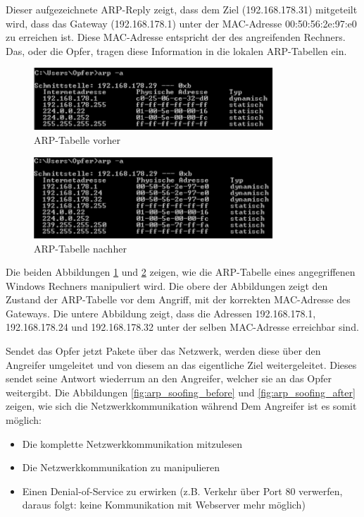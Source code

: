 Dieser aufgezeichnete ARP-Reply zeigt, dass dem Ziel (192.168.178.31) mitgeteilt wird, dass das Gateway (192.168.178.1) unter der MAC-Adresse 00:50:56:2e:97:e0 zu erreichen ist. Diese MAC-Adresse entspricht der des angreifenden Rechners.
Das, oder die Opfer, tragen diese Information in die lokalen ARP-Tabellen ein.
\\
\begin{figure}[h!]
	\centering
		\includegraphics[width=0.80\textwidth]{bilder/arpSpoofing/arp_vorher.pdf}
	\caption{ARP-Tabelle vorher}
	\label{fig:arp_vorher}
\end{figure}

\begin{figure}[h!]
	\centering
		\includegraphics[width=0.80\textwidth]{bilder/arpSpoofing/arp_nachher.pdf}
	\caption{ARP-Tabelle nachher}
	\label{fig:arp_nachher}
\end{figure}

Die beiden Abbildungen \ref{fig:arp_vorher} und \ref{fig:arp_nachher} zeigen, wie die ARP-Tabelle eines angegriffenen Windows Rechners manipuliert wird. Die obere der Abbildungen zeigt den Zustand der ARP-Tabelle vor dem Angriff, mit der korrekten MAC-Adresse des Gateways. Die untere Abbildung zeigt, dass die Adressen 192.168.178.1, 192.168.178.24 und 192.168.178.32 unter der selben MAC-Adresse erreichbar sind.

Sendet das Opfer jetzt Pakete über das Netzwerk, werden diese über den Angreifer umgeleitet und von diesem an das eigentliche Ziel weitergeleitet. Dieses sendet seine Antwort wiederrum an den Angreifer, welcher sie an das Opfer weitergibt. Die Abbildungen \ref{fig:arp_soofing_before} und \ref{fig:arp_soofing_after} zeigen, wie sich die Netzwerkkommunikation während 
Dem Angreifer ist es somit möglich:
\begin{itemize}
	\item Die komplette Netzwerkkommunikation mitzulesen
	\item Die Netzwerkkommunikation zu manipulieren
	\item Einen Denial-of-Service zu erwirken (z.B. Verkehr über Port 80 verwerfen, daraus folgt: keine Kommunikation mit Webserver mehr möglich)
\end{itemize}


